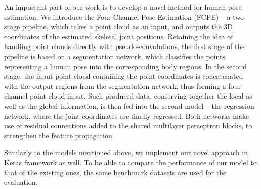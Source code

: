 An important part of our work is to develop a novel method for human pose estimation. We introduce the Four-Channel Pose Estimation (FCPE) – a two-stage pipeline, which takes a point cloud as an input, and outputs the 3D coordinates of the estimated skeletal joint positions. Retaining the idea of handling point clouds directly with pseudo-convolutions, the first stage of the pipeline is based on a segmentation network, which classifies the points representing a human pose into the corresponding body regions. In the second stage, the input point cloud containing the point coordinates is concatenated with the output regions from the segmentation network, thus forming a four-channel point cloud input. Such produced data, conserving together the local as well as the global information, is then fed into the second model – the regression network, where the joint coordinates are finally regressed. Both networks make use of residual connections added to the shared multilayer perceptron blocks, to strengthen the feature propagation. \par
\vspace{5mm}
\noindent Similarly to the models mentioned above, we implement our novel approach in Keras framework as well. To be able to compare the performance of our model to that of the existing ones, the same benchmark datasets are used for the evaluation.






